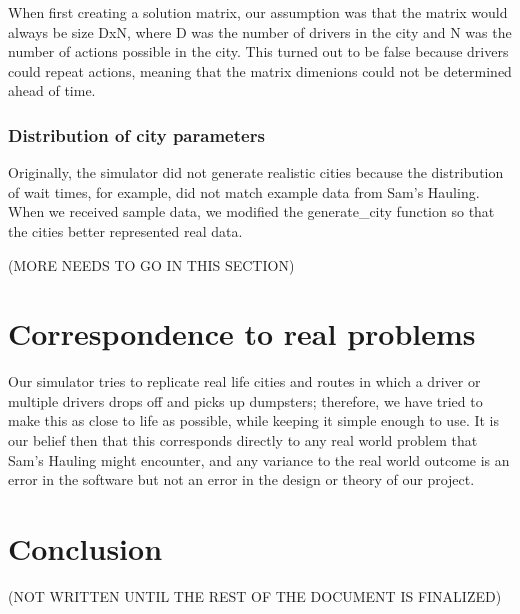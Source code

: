 \documentclass{article}
\begin{document}
When first creating a solution matrix, our assumption was that the matrix would always be size DxN, where D was the number of drivers in the city and N was the number of actions possible in the city.  This turned out to be false because drivers could repeat actions, meaning that the matrix dimenions could not be determined ahead of time.

\subsubsection{Distribution of city parameters}
Originally, the simulator did not generate realistic cities because the distribution of wait times, for example, did not match example data from Sam's Hauling.
When we received sample data, we modified the generate_city function so that the cities better represented real data.


(MORE NEEDS TO GO IN THIS SECTION)

\section{Correspondence to real problems}

Our simulator tries to replicate real life cities and routes in which a driver or multiple drivers drops off and picks up dumpsters; therefore, we have tried to make this as close to life as possible, while keeping it simple enough to use.  It is our belief then that this corresponds directly to any real world problem that Sam's Hauling might encounter, and any variance to the real world outcome is an error in the software but not an error in the design or theory of our project.


\section{Conclusion}

(NOT WRITTEN UNTIL THE REST OF THE DOCUMENT IS FINALIZED)
\end{document}
